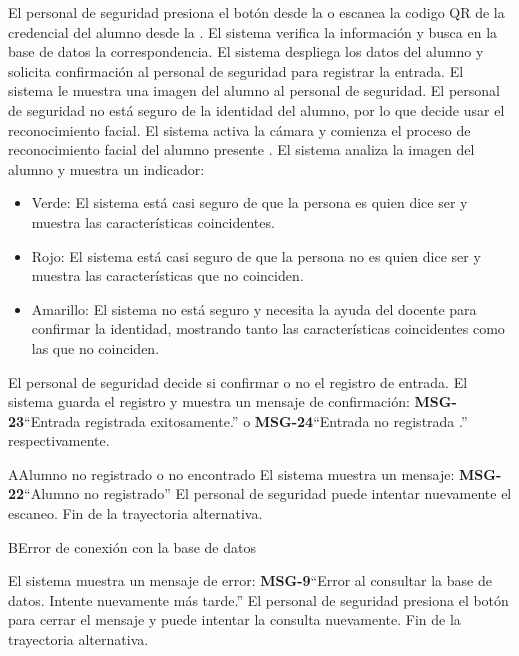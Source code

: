 \begin{UCtrayectoria}
\UCpaso[\UCactor] El personal de seguridad presiona el botón  desde la  o escanea la codigo QR de la credencial del alumno desde la .
\UCpaso El sistema verifica la información y busca en la base de datos la correspondencia.  
\UCpaso El sistema despliega los datos del alumno y solicita confirmación al personal de seguridad para registrar la entrada.
\UCpaso El sistema le muestra una imagen del alumno al personal de seguridad.
\UCpaso[\UCactor] El personal de seguridad no está seguro de la identidad del alumno, por lo que decide usar el reconocimiento facial.  
\UCpaso El sistema activa la cámara y comienza el proceso de reconocimiento facial del alumno presente . 
\UCpaso El sistema analiza la imagen del alumno y muestra un indicador:
\begin{itemize}
	\item Verde: El sistema está casi seguro de que la persona es quien dice ser y muestra las características coincidentes.
	\item Rojo: El sistema está casi seguro de que la persona no es quien dice ser y muestra las características que no coinciden. 
	\item Amarillo: El sistema no está seguro y necesita la ayuda del docente para confirmar la identidad, mostrando tanto las características coincidentes como las que no coinciden. 
\end{itemize}
\UCpaso[\UCactor] El personal de seguridad decide si confirmar o no el registro de entrada.
\UCpaso El sistema guarda el registro y muestra un mensaje de confirmación: {\bf MSG-23}{``Entrada registrada exitosamente.''} o {\bf MSG-24}{``Entrada no registrada .''} respectivamente.
\end{UCtrayectoria}
\begin{UCtrayectoriaA}{A}{Alumno no registrado o no encontrado}
\UCpaso El sistema muestra un mensaje: {\bf MSG-22}{``Alumno no registrado''}
\UCpaso[\UCactor] El personal de seguridad puede intentar nuevamente el escaneo.
\UCpaso Fin de la trayectoria alternativa.
\end{UCtrayectoriaA}
\begin{UCtrayectoriaA}{B}{Error de conexión con la base de datos}

\UCpaso El sistema muestra un mensaje de error: {\bf MSG-9}{``Error al consultar la base de datos. Intente nuevamente más tarde.''}
\UCpaso[\UCactor] El personal de seguridad presiona el botón  para cerrar el mensaje y puede intentar la consulta nuevamente.
\UCpaso Fin de la trayectoria alternativa.
\end{UCtrayectoriaA}
